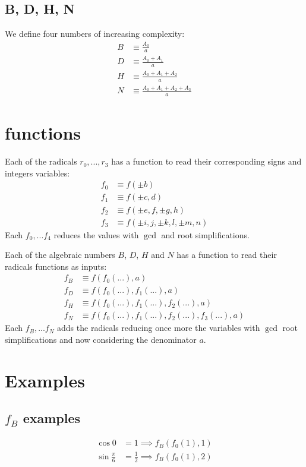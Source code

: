 \documentclass{article}
\begin{document}
\subsection{B, D, H, N}

We define four numbers of increasing complexity:
\begin{align}
B &\equiv \frac{A_0}{a}\\
D &\equiv \frac{A_0 + A_1}{a}\\
H &\equiv \frac{A_0 + A_1 + A_2}{a}\\
N &\equiv \frac{A_0 + A_1 + A_2 + A_3}{a}
\end{align}


\section{functions}
Each of the radicals $r_0,...,r_3$ has a function to read their corresponding signs and integers variables:
\begin{align}
f_0 &\equiv f(\pm b)\\
f_1 &\equiv f(\pm c, d)\\
f_2 &\equiv f(\pm e, f, \pm g, h)\\
f_3 &\equiv f(\pm i, j, \pm k, l, \pm m, n)
\end{align}
Each $f_0,...f_4$ reduces the values with $\gcd$ and root simplifications.

Each of the algebraic numbers $B$, $D$, $H$ and $N$ has a function to read their radicals functions as inputs:
\begin{align}
f_B &\equiv f(f_0(...), a)\\
f_D &\equiv f(f_0(...), f_1(...), a)\\
f_H &\equiv f(f_0(...), f_1(...), f_2(...), a)\\
f_N &\equiv f(f_0(...), f_1(...), f_2(...), f_3(...), a)
\end{align}
Each $f_B,...f_N$ adds the radicals reducing once more the variables with $\gcd$ root simplifications
and now considering the denominator $a$.

\section{Examples}

\subsection{$f_B$ examples}
\begin{align}
\cos{0}             &= 1           \implies f_B(f_0(1),1)\\
\sin{\frac{\pi}{6}} &= \frac{1}{2} \implies f_B(f_0(1),2)
\end{align}
\end{document}
